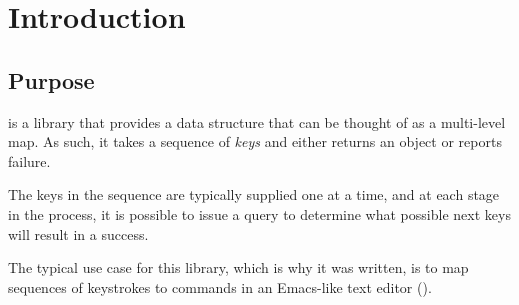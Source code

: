 \chapter{Introduction}
%

\section{Purpose}

\sysname{} is a library that provides a data structure that can be
thought of as a multi-level map.  As such, it takes a sequence of
\emph{keys} and either returns an object or reports failure.

The keys in the sequence are typically supplied one at a time, and at
each stage in the process, it is possible to issue a query to
determine what possible next keys will result in a success.

The typical use case for this library, which is why it was written, is
to map sequences of keystrokes to commands in an Emacs-like text
editor
(\cite{GNUEmacsLispReferenceManual,CraftOfTextEditiing,Finseth:1980:TPTa}).
